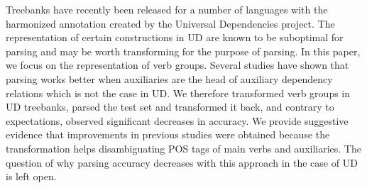 Treebanks have recently been released for a number of languages with the harmonized annotation created by the Universal Dependencies project. The representation of certain constructions in UD are known to be suboptimal for parsing and may be worth transforming for the purpose of parsing. In this paper, we focus on the representation of verb groups. Several studies have shown that parsing works better when auxiliaries are the head of auxiliary dependency relations which is not the case in UD. We therefore transformed verb groups in UD treebanks, parsed the test set and transformed it back, and contrary to expectations, observed significant decreases in accuracy. We provide suggestive evidence that improvements in previous studies were obtained because the transformation helps disambiguating POS tags of main verbs and auxiliaries. The question of why parsing accuracy decreases with this approach in the case of UD is left open.
